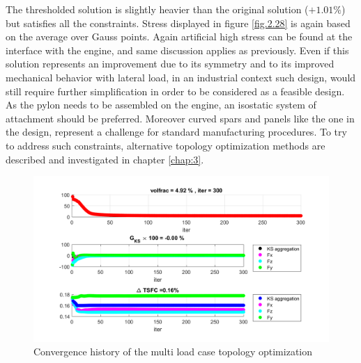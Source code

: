           The thresholded solution is slightly heavier than the original solution ($+1.01\%$) but satisfies all the constraints. Stress displayed in figure \ref{fig.2.28} is again based on the average over Gauss points. Again artificial high stress can be found at the interface with the engine, and same discussion applies as previously. Even if this solution represents an improvement due to its symmetry and to its improved mechanical behavior with lateral load, in an industrial context such design, would still require further simplification in order to be considered as a feasible design. As the pylon needs to be assembled on the engine, an isostatic system of attachment should be preferred. Moreover curved spars and panels like the one in the design, represent a challenge for standard manufacturing procedures. To try to address such constraints, alternative topology optimization methods are described and investigated in chapter \ref{chap:3}.
 \begin{figure}[ht]
  \centering
  \includegraphics[width=\textwidth]{images/Ch2/convergence_300_mlcs}
  \caption{Convergence history of the multi load case topology optimization}
  \label{fig.2.24}
  \end{figure}
